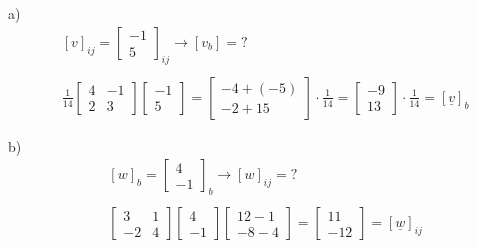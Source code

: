 \subsection{}

a)
$$
\begin{aligned}
&[v]_{i j}=\left[\begin{array}{c}-1 \\ 5\end{array}\right]_{i j}\rightarrow \left[v_{b}\right]=? \\
\\
&\frac{1}{14}\left[\begin{array}{cc}
    4 & -1 \\
    2 &  3
\end{array}\right] 
\left[\begin{array}{c}
    -1 \\
    5
\end{array}\right] =
\left[\begin{array}{c}
    -4 + (-5) \\
    -2 +  15
\end{array}\right] \cdot \frac{1}{14} = \left[\begin{array}{c}
    -9 \\
    13
\end{array}\right]\cdot \frac{1}{14} = [\underline{v}]_b
\end{aligned}
$$


\noindent b)
$$
\begin{aligned}
&[w]_{b}=\left[\begin{array}{c}4 \\ -1\end{array}\right]_{b}\rightarrow \left[w\right]_{ij}=? \\
\\
& \left[\begin{array}{cc}3 & 1 \\-2 & 4\end{array}\right]\left[\begin{array}{c}4 \\-1\end{array}\right]\left[\begin{array}{c}12-1 \\-8-4\end{array}\right]=\left[\begin{array}{c}11 \\-12\end{array}\right]=[\underline{w}]_{ij}
\end{aligned}
$$
